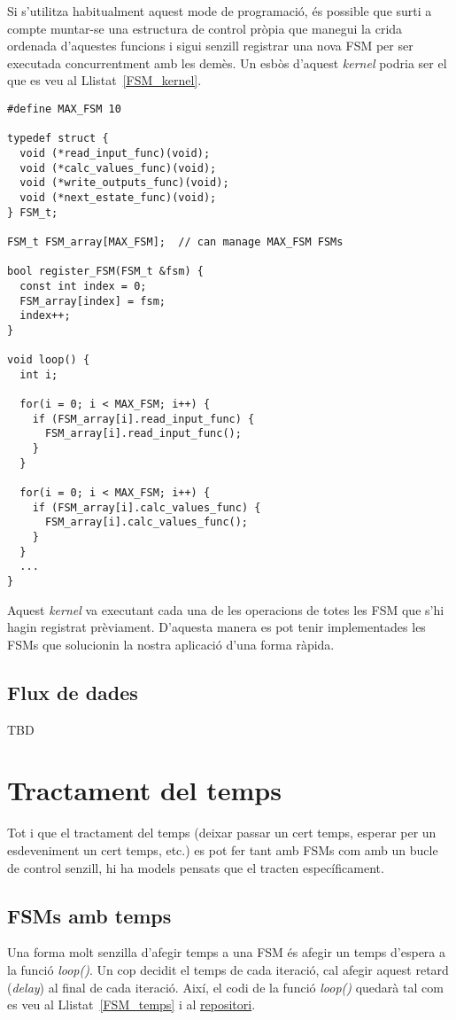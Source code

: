 Si s'utilitza habitualment aquest mode de programació, és possible que surti a compte muntar-se una estructura de control pròpia que manegui la crida ordenada d'aquestes funcions i sigui senzill registrar una nova FSM per ser executada concurrentment amb les demès. Un esbòs d'aquest {\em kernel} podria ser el que es veu al Llistat~\ref{FSM_kernel}.

\begin{lstlisting}[style=customc,caption={Estructura bàsica d'un {\em kernel} per múltiples FSMs},label=FSM_kernel]
#define MAX_FSM 10

typedef struct {
  void (*read_input_func)(void);
  void (*calc_values_func)(void);
  void (*write_outputs_func)(void);
  void (*next_estate_func)(void);
} FSM_t;

FSM_t FSM_array[MAX_FSM];  // can manage MAX_FSM FSMs 

bool register_FSM(FSM_t &fsm) {
  const int index = 0;
  FSM_array[index] = fsm;
  index++;
}

void loop() {
  int i;
  
  for(i = 0; i < MAX_FSM; i++) {
    if (FSM_array[i].read_input_func) {
      FSM_array[i].read_input_func();
    }
  }
  
  for(i = 0; i < MAX_FSM; i++) {
    if (FSM_array[i].calc_values_func) {
      FSM_array[i].calc_values_func();
    }
  }
  ...
}
\end{lstlisting}

Aquest {\em kernel} va executant cada una de les operacions de totes les FSM que s'hi hagin registrat prèviament. D'aquesta manera es pot tenir implementades les FSMs que solucionin la nostra aplicació d'una forma ràpida.


\section{Flux de dades}
\label{sec:dataflow}

TBD

\chapter{Tractament del temps}
\label{ch:tractamenttemps}

Tot i que el tractament del temps (deixar passar un cert temps, esperar per un esdeveniment un cert temps, etc.) es pot fer tant amb FSMs com amb un bucle de control senzill, hi ha models pensats que el tracten específicament.

\section{FSMs amb temps}
Una forma molt senzilla d'afegir temps a una FSM és afegir un temps d'espera a la funció {\em loop()}. Un cop decidit el temps de cada iteració, cal afegir aquest retard ({\em delay}) al final de cada iteració. Així, el codi de la funció {\em loop()} quedarà tal com es veu al Llistat~\ref{FSM_temps} i al \href{https://github.com/mariusmm/cursembedded/tree/master/Simplicity/FSM_3}{repositori}.

